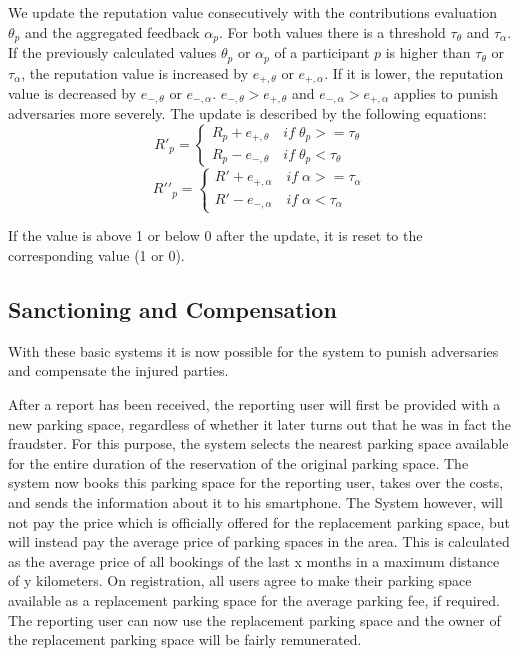 We update the reputation value consecutively with the contributions evaluation $\theta_p$  and the aggregated feedback $\alpha_p$. For both values there is a threshold $\tau_\theta$ and $\tau_\alpha$. If the previously calculated values $\theta_p$ or $\alpha_p$ of a participant $p$ is higher than $\tau_\theta$ or $\tau_\alpha$, the reputation value is increased by $e_{+,\theta}$ or $e_{+,\alpha}$. If it is lower, the reputation value is decreased by $e_{-,\theta}$ or $e_{-,\alpha}$. $e_{-,\theta}>e_{+,\theta}$ and $e_{-,\alpha}>e_{+,\alpha}$ applies to punish adversaries more severely. The update is described by the following equations: 
\begin{equation}
  R\prime_p = \begin{cases} R_p + e_{+,\theta}\quad if\; \theta_p>=\tau_\theta \\ R_p - e_{-,\theta}\quad if\; \theta_p<\tau_\theta \end{cases}
\end{equation}
\begin{equation}
  R\prime\prime_p = \begin{cases} R\prime + e_{+,\alpha}\quad if\; \alpha>=\tau_\alpha \\ R\prime - e_{-,\alpha}\quad if\; \alpha<\tau_\alpha \end{cases}
\end{equation}

If the value is above 1 or below 0 after the update, it is reset to the corresponding value (1 or 0).

\subsection{Sanctioning and Compensation}\label{section:Sanctioning and Compensation} With these basic systems it is now possible for the system to punish adversaries and compensate the injured parties. 

After a report has been received, the reporting user will first be provided with a new parking space, regardless of whether it later turns out that he was in fact the fraudster. For this purpose, the system selects the nearest parking space available for the entire duration of the reservation of the original parking space. The system now books this parking space for the reporting user, takes over the costs, and sends the information about it to his smartphone. The System however, will not pay the price which is officially offered for the replacement parking space, but will instead pay the average price of parking spaces in the area. This is calculated as the average price of all bookings of the last x months in a maximum distance of y kilometers. On registration, all users agree to make their parking space available as a replacement parking space for the average parking fee, if required. The reporting user can now use the replacement parking space and the owner of the replacement parking space will be fairly remunerated.

